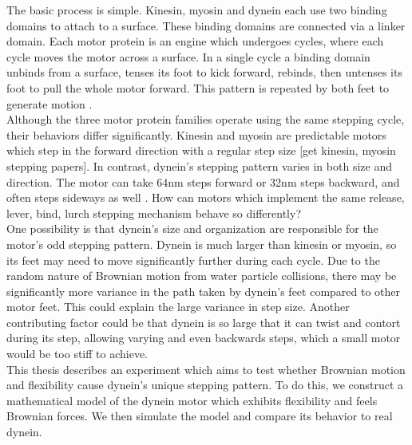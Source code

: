\documentclass[
11pt, %
english, %
singlespacing, %
headsepline, %
chapterinoneline, %
]{MastersDoctoralThesis} %
\begin{document}
The basic process is simple. Kinesin, myosin and dynein each use two binding domains to attach to a surface. These binding domains are connected via a linker domain. Each motor protein is an engine which undergoes cycles, where each cycle moves the motor across a surface. In a single cycle a binding domain unbinds from a surface, tenses its foot to kick forward, rebinds, then untenses its foot to pull the whole motor forward. This pattern is repeated by both feet to generate motion \cite{kinesin-cycle} \cite{myosin-cycle}.\\

Although the three motor protein families operate using the same stepping cycle, their behaviors differ significantly. Kinesin and myosin are predictable motors which step in the forward direction with a regular step size [get kinesin, myosin stepping papers]. In contrast, dynein's stepping pattern varies in both size and direction. The motor can take 64nm steps forward or 32nm steps backward, and often steps sideways as well \cite{weihongpaper}. How can motors which implement the same release, lever, bind, lurch stepping mechanism behave so differently?\\

One possibility is that dynein's size and organization are responsible for the motor's odd stepping pattern. Dynein is much larger than kinesin or myosin, so its feet may need to move significantly further during each cycle. Due to the random nature of Brownian motion from water particle collisions, there may be significantly more variance in the path taken by dynein's feet compared to other motor feet. This could explain the large variance in step size. Another contributing factor could be that dynein is so large that it can twist and contort during its step, allowing varying and even backwards steps, which a small motor would be too stiff to achieve.\\

This thesis describes an experiment which aims to test whether Brownian motion and flexibility cause dynein's unique stepping pattern. To do this, we construct a mathematical model of the dynein motor which exhibits flexibility and feels Brownian forces. We then simulate the model and compare its behavior to real dynein.\\

\end{document}
